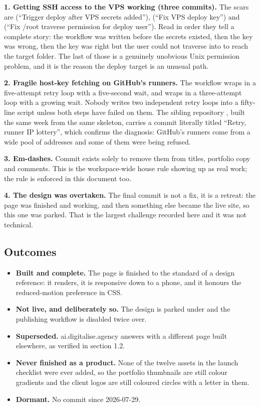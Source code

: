 \documentclass[11pt,a4paper]{article}
\begin{document}
\textbf{1. Getting SSH access to the VPS working (three commits).} The scars are
 (``Trigger deploy after VPS secrets added''), 
(``Fix VPS deploy key'') and  (``Fix /root traverse permission for
deploy user''). Read in order they tell a complete story: the workflow was written
before the secrets existed, then the key was wrong, then the key was right but the
 user could not traverse into  to reach the target
folder. The last of those is a genuinely unobvious Unix permission problem, and
it is the reason the deploy target is an unusual path.

\textbf{2. Fragile host-key fetching on GitHub's runners.} The workflow wraps
 in a five-attempt retry loop with a five-second wait, and
wraps  in a three-attempt loop with a growing wait. Nobody writes two
independent retry loops into a fifty-line script unless both steps have failed on
them. The sibling repository , built the same week from the
same skeleton, carries a commit literally titled ``Retry, runner IP lottery'',
which confirms the diagnosis: GitHub's runners come from a wide pool of addresses
and some of them were being refused.

\textbf{3. Em-dashes.} Commit  exists solely to remove them from
titles, portfolio copy and comments. This is the workspace-wide house rule showing
up as real work; the rule is enforced in this document too.

\textbf{4. The design was overtaken.} The final commit is not a fix, it is a
retreat: the page was finished and working, and then something else became the
live site, so this one was parked. That is the largest challenge recorded here and
it was not technical.

\subsection{Outcomes}

\begin{itemize}
\item \textbf{Built and complete.} The page is finished to the standard of a
  design reference: it renders, it is responsive down to a phone, and it honours
  the reduced-motion preference in CSS.
\item \textbf{Not live, and deliberately so.} The design is parked under
   and the publishing workflow is disabled twice over.
\item \textbf{Superseded.} ai.digitalise.agency answers with a different page
  built elsewhere, as verified in section 1.2.
\item \textbf{Never finished as a product.} None of the twelve assets in the
  launch checklist were ever added, so the portfolio thumbnails are still colour
  gradients and the client logos are still coloured circles with a letter in them.
\item \textbf{Dormant.} No commit since 2026-07-29.
\end{itemize}
\end{document}
